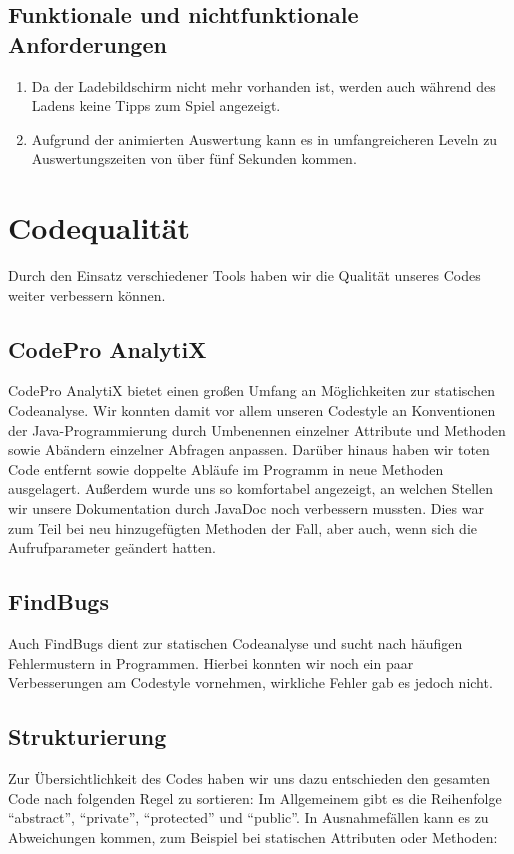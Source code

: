 \documentclass[parskip=full]{scrreprt}
\begin{document}
\section{Funktionale und nichtfunktionale Anforderungen}
\begin{enumerate}[resume]
	\item Da der Ladebildschirm nicht mehr vorhanden ist, werden auch während des Ladens keine Tipps zum Spiel angezeigt.
	\item Aufgrund der animierten Auswertung kann es in umfangreicheren Leveln zu Auswertungszeiten von über fünf Sekunden kommen.
\end{enumerate}

\chapter{Codequalität}

Durch den Einsatz verschiedener Tools haben wir die Qualität unseres Codes weiter verbessern können.

\section{CodePro AnalytiX}

CodePro AnalytiX bietet einen großen Umfang an Möglichkeiten zur statischen Codeanalyse. Wir konnten damit vor allem unseren Codestyle an Konventionen der Java-Programmierung durch Umbenennen einzelner Attribute und Methoden sowie Abändern einzelner Abfragen anpassen. Darüber hinaus haben wir toten Code entfernt sowie doppelte Abläufe im Programm in neue Methoden ausgelagert.
Außerdem wurde uns so komfortabel angezeigt, an welchen Stellen wir unsere Dokumentation durch JavaDoc noch verbessern mussten. Dies war zum Teil bei neu hinzugefügten Methoden der Fall, aber auch, wenn sich die Aufrufparameter geändert hatten.

\section{FindBugs}

Auch FindBugs dient zur statischen Codeanalyse und sucht nach häufigen Fehlermustern in Programmen. Hierbei konnten wir noch ein paar Verbesserungen am Codestyle vornehmen, wirkliche Fehler gab es jedoch nicht. 

\section{Strukturierung}
Zur Übersichtlichkeit des Codes haben wir uns dazu entschieden den gesamten Code nach folgenden Regel zu sortieren: \newline
Im Allgemeinem gibt es die Reihenfolge "`abstract"', "`private"', "`protected"' und "`public"'. In Ausnahmefällen kann es zu Abweichungen kommen, zum Beispiel bei statischen Attributen oder Methoden:
\end{document}
